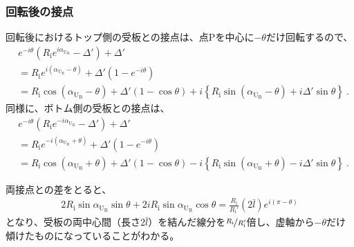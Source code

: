 \subsubsection{回転後の接点}
回転後におけるトップ側の受板との接点は、点Pを中心に$-\theta$だけ回転するので、
\begin{align*}
  &  e^{-i\theta}\left(R_\mathrm ie^{i\alpha_{\mathrm U_\mathrm B}}-\varDelta'\right)+\varDelta'\\
  &= R_\mathrm ie^{i(\alpha_{\mathrm U_\mathrm B}-\theta)}+\varDelta'\!\left(1-e^{-i\theta}\right)\\
  &= R_\mathrm i\cos(\alpha_{\mathrm U_\mathrm B}-\theta)+\varDelta'(1-\cos\theta)
     +i\left\{R_\mathrm i\sin(\alpha_{\mathrm U_\mathrm B}-\theta)+i\varDelta'\sin\theta\right\}\ .
\end{align*}
同様に、ボトム側の受板との接点は、
\begin{align*}
  &  e^{-i\theta}\left(R_\mathrm ie^{-i\alpha_{\mathrm U_\mathrm B}}-\varDelta'\right)+\varDelta'\\
  &= R_\mathrm ie^{-i(\alpha_{\mathrm U_\mathrm B}+\theta)}+\varDelta'\!\left(1-e^{-i\theta}\right)\\
  &= R_\mathrm i\cos(\alpha_{\mathrm U_\mathrm B}+\theta)+\varDelta'(1-\cos\theta)
     -i\left\{R_\mathrm i\sin(\alpha_{\mathrm U_\mathrm B}+\theta)-i\varDelta'\sin\theta\right\}\ .
\end{align*}
\begin{hosoku}
両接点との差をとると、
\begin{align*}
  2R_\mathrm i\sin\alpha_{\mathrm U_\mathrm B}\sin\theta+2iR_\mathrm i\sin\alpha_{\mathrm U_\mathrm B}\cos\theta
  = \frac{R_\mathrm i}{R_\mathrm i'}(2\bar l)e^{i(\pi-\theta)}
\end{align*}
となり、受板の両中心間（長さ$2\bar l$）を結んだ線分を$\nicefrac{R_\mathrm i}{R_\mathrm i'}$倍し、虚軸から$-\theta$だけ傾けたものになっていることがわかる。
\end{hosoku}


